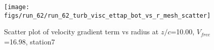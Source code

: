 \begin{figure}[H]
\centering
\texttt{[image: figs/run\_62/run\_62\_turb\_visc\_ettap\_bot\_vs\_r\_mesh\_scatter]}
\caption{Scatter plot of velocity gradient term vs radius at $z/c$=10.00, $V_{free}$=16.98, station7}
\label{fig:run_62_turb_visc_ettap_bot_vs_r_mesh_scatter}
\end{figure}


